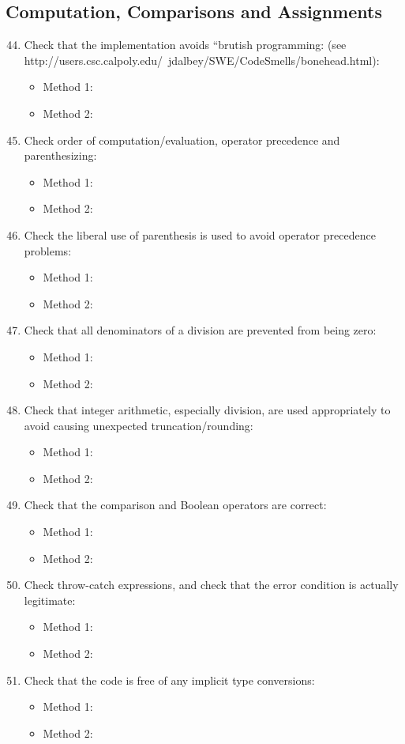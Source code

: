 \subsection{Computation, Comparisons and Assignments}
\begin{enumerate}
	\setcounter{enumi}{43}
	\item Check that the implementation avoids “brutish programming: (see http://users.csc.calpoly.edu/~jdalbey/SWE/CodeSmells/bonehead.html):
	\begin{itemize}
		\item Method 1: 
		\item Method 2:
	\end{itemize}
	\item Check order of computation/evaluation, operator precedence and parenthesizing:
	\begin{itemize}
		\item Method 1: 
		\item Method 2:
	\end{itemize}
	\item Check the liberal use of parenthesis is used to avoid operator precedence problems:
	\begin{itemize}
		\item Method 1: 
		\item Method 2: 
	\end{itemize}
	\item Check that all denominators of a division are prevented from being zero:
	\begin{itemize}
		\item Method 1: 
		\item Method 2:
	\end{itemize}
	\item Check that integer arithmetic, especially division, are used appropriately to avoid causing unexpected truncation/rounding:
	\begin{itemize}
		\item Method 1: 
		\item Method 2:
	\end{itemize}
	\item Check that the comparison and Boolean operators are correct:
	\begin{itemize}
		\item Method 1: 
		\item Method 2: 
	\end{itemize}
	\item Check throw-catch expressions, and check that the error condition is actually legitimate:
	\begin{itemize}
		\item Method 1: 
		\item Method 2: 
	\end{itemize}
	\item Check that the code is free of any implicit type conversions:
	\begin{itemize}
		\item Method 1: 
		\item Method 2: 
	\end{itemize}
\end{enumerate}